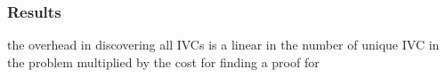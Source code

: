 \subsubsection{Results}
\label{sec:results}

\newcommand{\takeaway}[1]{
\vspace{6pt}
\noindent\fbox{\parbox{0.975\columnwidth}{#1}}
\vspace{6pt}
}
 the overhead
in discovering all IVCs is a linear in the number of unique IVC
in the problem multiplied by the cost for finding a proof for
%
%
%
%
%
%
%
%
